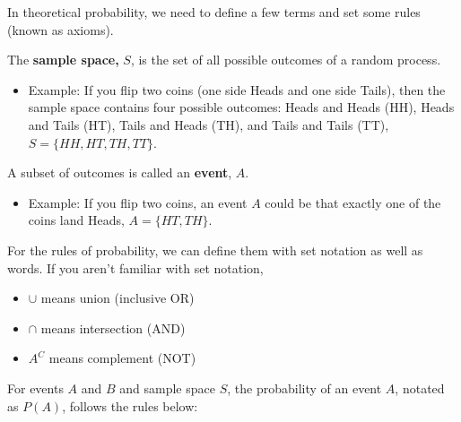 \documentclass[
]{book}
\providecommand{\tightlist}{%
  \setlength{\itemsep}{0pt}\setlength{\parskip}{0pt}}
\begin{document}
In theoretical probability, we need to define a few terms and set some rules (known as axioms).

The \textbf{sample space,} \(S\), is the set of all possible outcomes of a random process.

\begin{itemize}
\tightlist
\item
  Example: If you flip two coins (one side Heads and one side Tails), then the sample space contains four possible outcomes: Heads and Heads (HH), Heads and Tails (HT), Tails and Heads (TH), and Tails and Tails (TT), \(S = \{HH,HT,TH,TT\}\).
\end{itemize}

A subset of outcomes is called an \textbf{event}, \(A\).

\begin{itemize}
\tightlist
\item
  Example: If you flip two coins, an event \(A\) could be that exactly one of the coins land Heads, \(A = \{HT,TH\}\).
\end{itemize}

For the rules of probability, we can define them with set notation as well as words. If you aren't familiar with set notation,

\begin{itemize}
\tightlist
\item
  \(\cup\) means union (inclusive OR)
\item
  \(\cap\) means intersection (AND)
\item
  \(A^C\) means complement (NOT)
\end{itemize}

For events \(A\) and \(B\) and sample space \(S\), the probability of an event \(A\), notated as \(P(A)\), follows the rules below:
\end{document}
